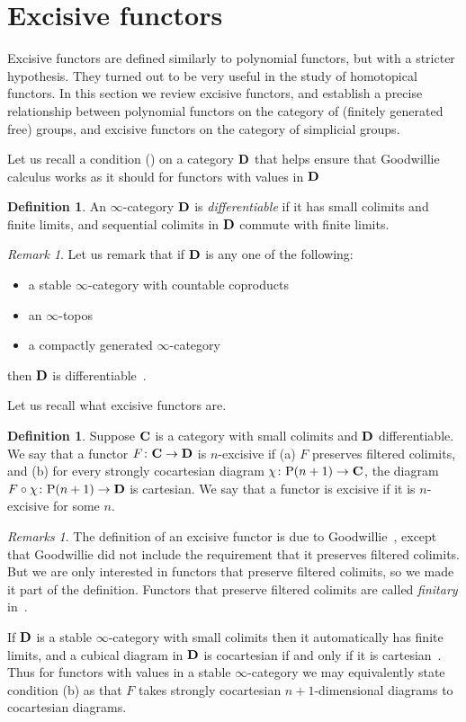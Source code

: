 \documentclass[psamsfonts]{amsart}
\theoremstyle{plain}
\theoremstyle{definition}
\newtheorem{defn}[thm]{Definition}
\theoremstyle{remark}
\newtheorem{rem}[thm]{Remark}
\newtheorem{rems}[thm]{Remarks}
\newcommand{\catname}[1]{{\normalfont\textbf{#1}}}
\newcommand{\power}{\mathrm{P}}
\begin{document}
\section{Excisive functors}\label{section:excisive}
Excisive functors are defined similarly to polynomial functors, but with a stricter hypothesis. They turned out to be very useful in the study of homotopical functors. In this section we review excisive functors, and establish a precise relationship between polynomial functors on the category of (finitely generated free) groups, and excisive functors on the category of simplicial groups.

Let us recall a condition (\cite[Definition 6.1.1.6]{LurieHA}) on a category $\catname{D}$ that helps ensure that Goodwillie calculus works as it should for functors with values in $\catname{D}$
\begin{defn}
An $\infty$-category $\catname{D}$ is {\it differentiable} if it has small colimits and finite limits, and sequential colimits in $\catname{D}$ commute with finite limits. 
\end{defn}
\begin{rem}
Let us remark that if $\catname{D}$ is any one of the following:
\begin{itemize}
\item a stable $\infty$-category with countable coproducts
\item an $\infty$-topos
\item a compactly generated $\infty$-category
\end{itemize}
then $\catname{D}$ is differentiable~\cite[Examples 6.1.1.7-9]{LurieHA}.
\end{rem}
Let us recall what excisive functors are.
\begin{defn}\label{def: excisive}
Suppose $\catname{C}$ is a category with small colimits and $\catname{D}$ differentiable. We say that a functor $F\colon \catname{C}\to \catname{D}$ is $n$-excisive if (a) $F$ preserves filtered colimits, and (b) for every strongly cocartesian diagram $\chi\colon \power(n+1)\to \catname{C}$, the diagram $F\circ \chi\colon \power(n+1)\to \catname{D}$ is cartesian.
We say that a functor is excisive if it is $n$-excisive for some $n$.
\end{defn}
\begin{rems}
The definition of an excisive functor is due to Goodwillie~\cite{Goodwillie2003}, except that Goodwillie did not include the requirement that it preserves filtered colimits. But we are only interested in functors that preserve filtered colimits, so we made it part of the definition. Functors that preserve filtered colimits are called {\it finitary} in~\cite{Goodwillie2003}.

If $\catname{D}$ is a stable $\infty$-category with small colimits then it automatically has finite limits, and a cubical diagram in $\catname{D}$ is cocartesian if and only if it is cartesian~\cite[Proposition 1.2.4.13]{LurieHA}. Thus for functors with values in a stable $\infty$-category we may equivalently state condition (b) as that $F$ takes strongly cocartesian $n+1$-dimensional diagrams to cocartesian diagrams.
\end{rems}
\end{document}

